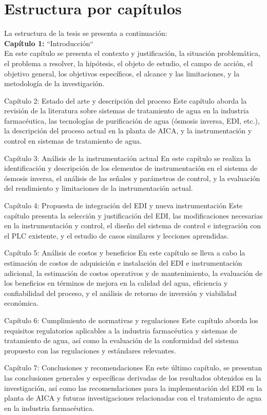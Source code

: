 \section*{Estructura por capítulos}
La estructura de la tesis se presenta a continuación:\\
\textbf{Capítulo 1:}  ``Introducción``\\
En este capítulo se presenta el contexto y justificación, la situación problemática, el problema a resolver, la hipótesis, el objeto de estudio, el campo de acción, el objetivo general, los objetivos específicos, el alcance y las limitaciones, y la metodología de la investigación.



Capítulo 2: Estado del arte y descripción del proceso
Este capítulo aborda la revisión de la literatura sobre sistemas de tratamiento de agua en la industria farmacéutica, las tecnologías de purificación de agua (ósmosis inversa, EDI, etc.), la descripción del proceso actual en la planta de AICA, y la instrumentación y control en sistemas de tratamiento de agua.

Capítulo 3: Análisis de la instrumentación actual
En este capítulo se realiza la identificación y descripción de los elementos de instrumentación en el sistema de ósmosis inversa, el análisis de las señales y parámetros de control, y la evaluación del rendimiento y limitaciones de la instrumentación actual.

Capítulo 4: Propuesta de integración del EDI y nueva instrumentación
Este capítulo presenta la selección y justificación del EDI, las modificaciones necesarias en la instrumentación y control, el diseño del sistema de control e integración con el PLC existente, y el estudio de casos similares y lecciones aprendidas.

Capítulo 5: Análisis de costos y beneficios
En este capítulo se lleva a cabo la estimación de costos de adquisición e instalación del EDI e instrumentación adicional, la estimación de costos operativos y de mantenimiento, la evaluación de los beneficios en términos de mejora en la calidad del agua, eficiencia y confiabilidad del proceso, y el análisis de retorno de inversión y viabilidad económica.

Capítulo 6: Cumplimiento de normativas y regulaciones
Este capítulo aborda los requisitos regulatorios aplicables a la industria farmacéutica y sistemas de tratamiento de agua, así como la evaluación de la conformidad del sistema propuesto con las regulaciones y estándares relevantes.

Capítulo 7: Conclusiones y recomendaciones
En este último capítulo, se presentan las conclusiones generales y específicas derivadas de los resultados obtenidos en la investigación, así como las recomendaciones para la implementación del EDI en la planta de AICA y futuras investigaciones relacionadas con el tratamiento de agua en la industria farmacéutica.
